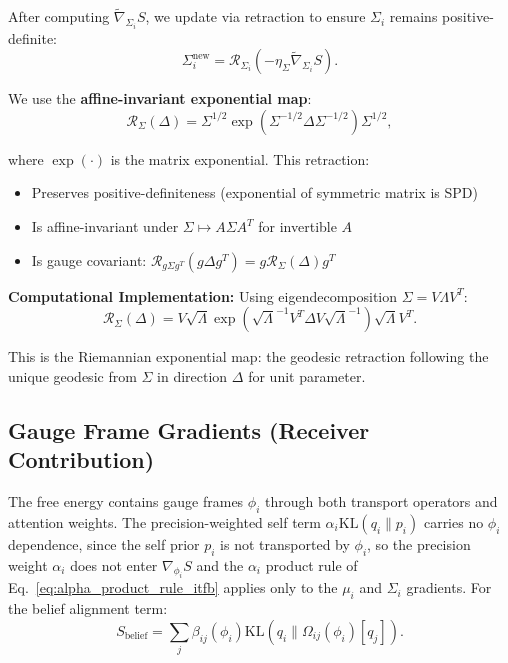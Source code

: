 \documentclass[11pt]{article}
\begin{document}
After computing $\tilde{\nabla}_{\Sigma_i} S$, we update via retraction to ensure $\Sigma_i$ remains positive-definite:
\begin{equation}
\Sigma_i^{\mathrm{new}} = \mathcal{R}_{\Sigma_i}(-\eta_\Sigma \tilde{\nabla}_{\Sigma_i} S).
\end{equation}

We use the \textbf{affine-invariant exponential map}:
\begin{equation}
\mathcal{R}_{\Sigma}(\Delta) = \Sigma^{1/2} \exp\left(\Sigma^{-1/2} \Delta \Sigma^{-1/2}\right) \Sigma^{1/2},
\end{equation}

where $\exp(\cdot)$ is the matrix exponential. This retraction:
\begin{itemize}
\item Preserves positive-definiteness (exponential of symmetric matrix is SPD)
\item Is affine-invariant under $\Sigma \mapsto A\Sigma A^T$ for invertible $A$
\item Is gauge covariant: $\mathcal{R}_{g\Sigma g^T}(g\Delta g^T) = g \mathcal{R}_{\Sigma}(\Delta) g^T$
\end{itemize}

\textbf{Computational Implementation:} Using eigendecomposition $\Sigma = V\Lambda V^T$:
\begin{equation}
\mathcal{R}_{\Sigma}(\Delta) = V \sqrt{\Lambda} \exp\left(\sqrt{\Lambda}^{-1} V^T \Delta V \sqrt{\Lambda}^{-1}\right) \sqrt{\Lambda} V^T.
\end{equation}

This is the Riemannian exponential map: the geodesic retraction following the unique geodesic from $\Sigma$ in direction $\Delta$ for unit parameter.

\subsection*{Gauge Frame Gradients (Receiver Contribution)}

The free energy contains gauge frames $\phi_i$ through both transport operators and attention weights. The precision-weighted self term $\alpha_i \mathrm{KL}(q_i \| p_i)$ carries no $\phi_i$ dependence, since the self prior $p_i$ is not transported by $\phi_i$, so the precision weight $\alpha_i$ does not enter $\nabla_{\phi_i} S$ and the $\alpha_i$ product rule of Eq.~\eqref{eq:alpha_product_rule_itfb} applies only to the $\mu_i$ and $\Sigma_i$ gradients. For the belief alignment term:
\begin{equation}
S_{\mathrm{belief}} = \sum_j \beta_{ij}(\phi_i)  \mathrm{KL}(q_i \| \Omega_{ij}(\phi_i)[q_j]).
\end{equation}
\end{document}
